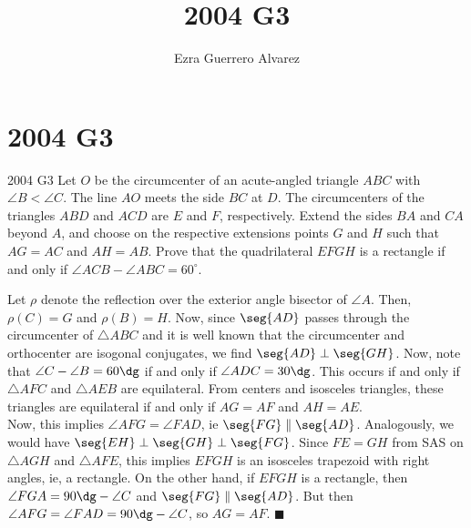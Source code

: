 \documentclass[14pt]{article}
\title{2004 G3}
\author{Ezra Guerrero Alvarez}
\begin{document}
\maketitle
	
\section*{2004 G3}

\begin{statement}{2004 G3}
	Let $O$ be the circumcenter of an acute-angled triangle $ABC$ with ${\angle B<\angle C}$. The line $AO$ meets the side $BC$ at $D$. The circumcenters of the triangles $ABD$ and $ACD$ are $E$ and $F$, respectively. Extend the sides $BA$ and $CA$ beyond $A$, and choose on the respective extensions points $G$ and $H$ such that ${AG=AC}$ and ${AH=AB}$. Prove that the quadrilateral $EFGH$ is a rectangle if and only if ${\angle ACB-\angle ABC=60^{\circ }}$.
\end{statement}
Let $\rho$ denote the reflection over the exterior angle bisector of $\angle A$. Then, $\rho(C)=G$ and $\rho(B)=H$. Now, since $\seg{AD}$ passes through the circumcenter of $\triangle ABC$ and it is well known that the circumcenter and orthocenter are isogonal conjugates, we find $\seg{AD}\perp\seg{GH}$. Now, note that $\angle C-\angle B = 60\dg$ if and only if $\angle ADC=30\dg$. This occurs if and only if $\triangle AFC$ and $\triangle AEB$ are equilateral. From centers and isosceles triangles, these triangles are equilateral if and only if $AG=AF$ and $AH=AE$.\\
Now, this implies $\angle AFG = \angle FAD$, ie $\seg{FG}\parallel\seg{AD}$. Analogously, we would have $\seg{EH}\perp\seg{GH}\perp\seg{FG}$. Since $FE=GH$ from SAS on $\triangle AGH$ and $\triangle AFE$, this implies $EFGH$ is an isosceles trapezoid with right angles, ie, a rectangle. On the other hand, if $EFGH$ is a rectangle, then $\angle FGA = 90\dg-\angle C$ and $\seg{FG}\parallel\seg{AD}$. But then $\angle AFG=\angle FAD = 90\dg-\angle C$, so $AG=AF$. $\blacksquare$
	
\end{document}
